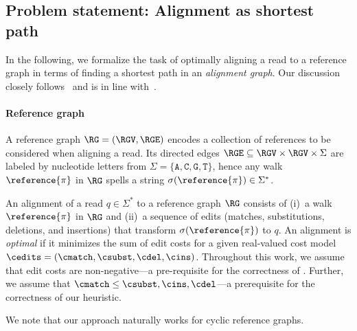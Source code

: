 \subsection{Problem statement: Alignment as shortest path} \label{sec:task}
%
In the following, we formalize the task of optimally aligning a read to a
reference graph in terms of finding a shortest path in an \emph{alignment
graph}. Our discussion closely follows~\citep[]{ivanov2020astarix} and
is in line with~\citep{rautiainen_aligning_2017}.

\paragraph{Reference graph}
%
A reference graph $\RG=(\RGV,\RGE)$ encodes a collection of references to be
considered when aligning a read. Its directed edges $\RGE \subseteq \RGV \times
\RGV \times \Sigma$ are labeled by nucleotide letters from $\Sigma =
\{\texttt{A},\texttt{C},\texttt{G},\texttt{T}\}$, hence any walk
$\reference{\pi}$ in $\RG$ spells a string $\sigma(\reference{\pi}) \in
\Sigma^*$.

An alignment of a read $q \in \Sigma^*$ to a reference graph $\RG$ consists of
(i)~a walk $\reference{\pi}$ in $\RG$ and (ii)~a sequence of edits (matches,
substitutions, deletions, and insertions) that transform
$\sigma(\reference{\pi})$ to $q$. An alignment is \emph{optimal} if it minimizes
the sum of edit costs for a given real-valued cost model $\cedits = (\cmatch,
\csubst,\cdel, \cins)$.
%
Throughout this work, we assume that edit costs are non-negative---a
pre-requisite for the correctness of \A. Further, we assume that $\cmatch \leq
\csubst, \cins, \cdel$---a prerequisite for the correctness of our heuristic.

We note that our approach naturally works for cyclic reference graphs.

